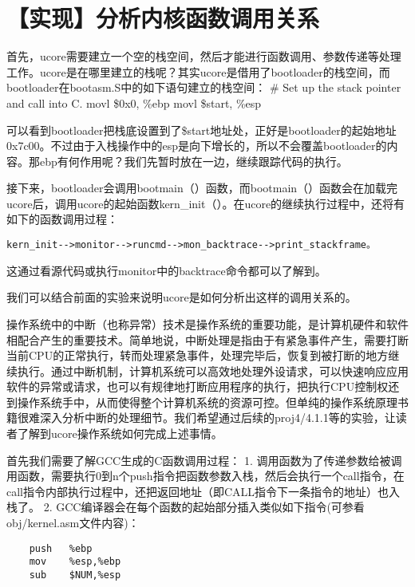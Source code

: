 \section{【实现】分析内核函数调用关系}\label{ux5b9eux73b0ux5206ux6790ux5185ux6838ux51fdux6570ux8c03ux7528ux5173ux7cfb}

首先，ucore需要建立一个空的栈空间，然后才能进行函数调用、参数传递等处理工作。ucore是在哪里建立的栈呢？其实ucore是借用了bootloader的栈空间，而bootloader在bootasm.S中的如下语句建立的栈空间：
\# Set up the stack pointer and call into C. movl \$0x0, \%ebp movl
\$start, \%esp

可以看到bootloader把栈底设置到了\$start地址处，正好是bootloader的起始地址0x7c00。不过由于入栈操作中的esp是向下增长的，所以不会覆盖bootloader的内容。那ebp有何作用呢？我们先暂时放在一边，继续跟踪代码的执行。

接下来，bootloader会调用bootmain（）函数，而bootmain（）函数会在加载完ucore后，调用ucore的起始函数kern\_init（）。在ucore的继续执行过程中，还将有如下的函数调用过程：

\begin{lstlisting}
kern_init-->monitor-->runcmd-->mon_backtrace-->print_stackframe。
\end{lstlisting}

这通过看源代码或执行monitor中的backtrace命令都可以了解到。

我们可以结合前面的实验来说明ucore是如何分析出这样的调用关系的。

操作系统中的中断（也称异常）技术是操作系统的重要功能，是计算机硬件和软件相配合产生的重要技术。简单地说，中断处理是指由于有紧急事件产生，需要打断当前CPU的正常执行，转而处理紧急事件，处理完毕后，恢复到被打断的地方继续执行。通过中断机制，计算机系统可以高效地处理外设请求，可以快速响应应用软件的异常或请求，也可以有规律地打断应用程序的执行，把执行CPU控制权还到操作系统手中，从而使得整个计算机系统的资源可控。但单纯的操作系统原理书籍很难深入分析中断的处理细节。我们希望通过后续的proj4/4.1.1等的实验，让读者了解到ucore操作系统如何完成上述事情。

首先我们需要了解GCC生成的C函数调用过程： 1.
调用函数为了传递参数给被调用函数，需要执行0到n个push指令把函数参数入栈，然后会执行一个call指令，在call指令内部执行过程中，还把返回地址（即CALL指令下一条指令的地址）也入栈了。
2.
GCC编译器会在每个函数的起始部分插入类似如下指令(可参看obj/kernel.asm文件内容)：

\begin{lstlisting}
    push   %ebp
    mov    %esp,%ebp
    sub    $NUM,%esp
\end{lstlisting}

